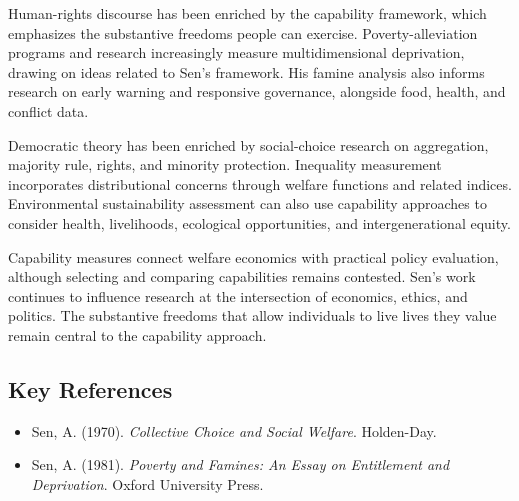Human-rights discourse has been enriched by the capability framework, which
emphasizes the substantive freedoms people can exercise. Poverty-alleviation
programs and research increasingly measure multidimensional deprivation, drawing
on ideas related to Sen's framework. His famine analysis also informs research on
early warning and responsive governance, alongside food, health, and conflict
data.

Democratic theory has been enriched by social-choice research on aggregation,
majority rule, rights, and minority protection. Inequality measurement incorporates
distributional concerns through welfare functions and related indices. Environmental
sustainability assessment can also use capability approaches to consider health,
livelihoods, ecological opportunities, and intergenerational equity.

Capability measures connect welfare economics with practical policy evaluation,
although selecting and comparing capabilities remains contested. Sen's work
continues to influence research at the intersection of economics, ethics, and
politics. The substantive freedoms that allow individuals to live lives they value
remain central to the capability approach.

\subsection*{Key References}
\begin{itemize}
    \item Sen, A. (1970). \textit{Collective Choice and Social Welfare}. Holden-Day.
    \item Sen, A. (1981). \textit{Poverty and Famines: An Essay on Entitlement and Deprivation}. Oxford University Press.
\end{itemize}
